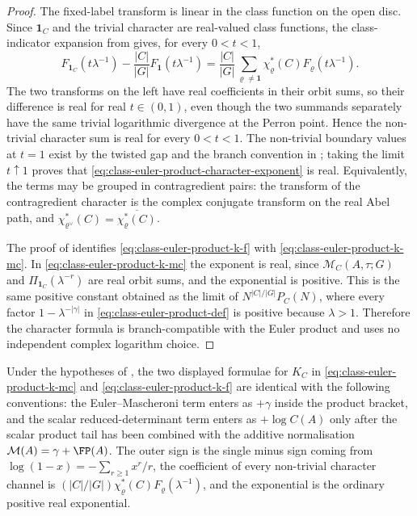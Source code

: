 \begin{proof}
  The fixed-label transform is linear in the class function on the open
  disc. Since \(\mathbf1_C\) and the trivial character are real-valued
  class functions, the class-indicator expansion from
   gives, for every \(0<t<1\),
  \[
    F_{\mathbf1_C}(t\lambda^{-1})
    -
    \frac{|C|}{|G|}F_{\mathbf1}(t\lambda^{-1})
    =
    \frac{|C|}{|G|}
      \sum_{\varrho\neq\mathbf1}
        \chi_\varrho^\ast(C)F_\varrho(t\lambda^{-1}).
  \]
  The two transforms on the left have real coefficients in their orbit
  sums, so their difference is real for real \(t\in(0,1)\), even though
  the two summands separately have the same trivial logarithmic
  divergence at the Perron point. Hence the non-trivial character sum is
  real for every \(0<t<1\). The non-trivial boundary values at \(t=1\)
  exist by the twisted gap and the branch convention in
  ; taking the limit
  \(t\uparrow1\) proves that
  \eqref{eq:class-euler-product-character-exponent} is real. Equivalently,
  the terms may be grouped in contragredient pairs: the transform of the
  contragredient character is the complex conjugate transform on the real
  Abel path, and
  \(\chi_{\varrho^\vee}^\ast(C)=\overline{\chi_\varrho^\ast(C)}\).

  The proof of  identifies
  \eqref{eq:class-euler-product-k-f} with
  \eqref{eq:class-euler-product-k-mc}. In
  \eqref{eq:class-euler-product-k-mc} the exponent is real, since
  \(\mathcal M_C(A,\tau;G)\) and
  \(\Pi_{\mathbf1_C}(\lambda^{-r})\) are real orbit sums, and the
  exponential is positive. This is the same positive constant obtained as
  the limit of
  \(N^{|C|/|G|}P_C(N)\), where every factor
  \(1-\lambda^{-|\gamma|}\) in \eqref{eq:class-euler-product-def} is
  positive because \(\lambda>1\). Therefore the character formula is
  branch-compatible with the Euler product and uses no independent
  complex logarithm choice.
\end{proof}

\begin{lemma}
  \label{lem:class-product-sign-normalisation-conventions}
  Under the hypotheses of , the two
  displayed formulae for \(K_C\) in
  \eqref{eq:class-euler-product-k-mc} and
  \eqref{eq:class-euler-product-k-f} are identical with the following
  conventions: the Euler--Mascheroni term enters as \(+\gamma\) inside
  the product bracket, and the scalar reduced-determinant term enters as
  \(+\log C(A)\) only after the scalar product tail has been combined with
  the additive normalisation \(\mathcal M(A)=\gamma+\FP(A)\).  The outer sign
  is the single minus sign coming from
  \(\log(1-x)=-\sum_{r\ge1}x^r/r\), the coefficient of every
  non-trivial character channel is
  \((|C|/|G|)\chi_\varrho^\ast(C)F_\varrho(\lambda^{-1})\), and
  the exponential is the ordinary positive real exponential.
\end{lemma}

